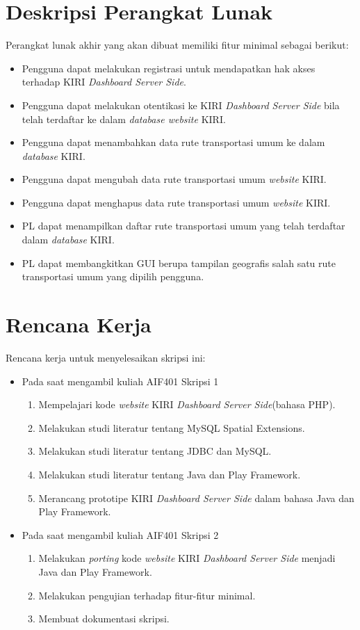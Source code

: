 \documentclass[a4paper,twoside]{article}
\begin{document}
\section{Deskripsi Perangkat Lunak}
Perangkat lunak akhir yang akan dibuat memiliki fitur minimal sebagai berikut:
\begin{itemize}
	\item Pengguna dapat melakukan registrasi untuk mendapatkan hak akses terhadap KIRI \textit{Dashboard Server Side}.
	\item Pengguna dapat melakukan otentikasi ke KIRI \textit{Dashboard Server Side} bila telah terdaftar ke dalam \textit{database website} KIRI.
	\item Pengguna dapat menambahkan data rute transportasi umum ke dalam \textit{database} KIRI.
	\item Pengguna dapat mengubah data rute transportasi umum \textit{website} KIRI.
	\item Pengguna dapat menghapus data rute transportasi umum \textit{website} KIRI.
	\item PL dapat menampilkan daftar rute transportasi umum yang telah terdaftar dalam \textit{database} KIRI.
	\item PL dapat membangkitkan GUI berupa tampilan geografis salah satu rute transportasi umum yang dipilih pengguna.
	\end{itemize}

\section{Rencana Kerja}
Rencana kerja untuk menyelesaikan skripsi ini:
\begin{itemize}
	\item Pada saat mengambil kuliah AIF401 Skripsi 1
	\begin{enumerate}
		\item Mempelajari kode \textit{website} KIRI \textit{Dashboard Server Side}(bahasa PHP).
		\item Melakukan studi literatur tentang MySQL Spatial Extensions.
		\item Melakukan studi literatur tentang JDBC dan MySQL.
		\item Melakukan studi literatur tentang Java dan Play Framework.
		\item Merancang prototipe KIRI \textit{Dashboard Server Side} dalam bahasa Java dan Play Framework.
	\end{enumerate}
	\item Pada saat mengambil kuliah AIF401 Skripsi 2
	\begin{enumerate}
		\item Melakukan \textit{porting} kode \textit{website} KIRI \textit{Dashboard Server Side} menjadi Java dan Play Framework.
		\item Melakukan pengujian terhadap fitur-fitur minimal.
		\item Membuat dokumentasi skripsi.
	\end{enumerate}
\end{itemize}
\end{document}
